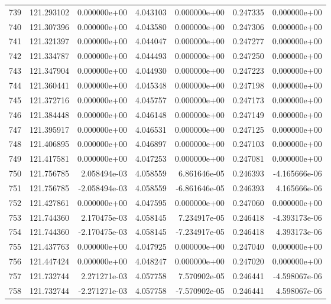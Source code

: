 \begin{tabular}{rrrrrrr}
 739 & 121.293102 &  0.000000e+00 &  4.043103 &  0.000000e+00 &   0.247335 &  0.000000e+00 \\
 740 & 121.307396 &  0.000000e+00 &  4.043580 &  0.000000e+00 &   0.247306 &  0.000000e+00 \\
 741 & 121.321397 &  0.000000e+00 &  4.044047 &  0.000000e+00 &   0.247277 &  0.000000e+00 \\
 742 & 121.334787 &  0.000000e+00 &  4.044493 &  0.000000e+00 &   0.247250 &  0.000000e+00 \\
 743 & 121.347904 &  0.000000e+00 &  4.044930 &  0.000000e+00 &   0.247223 &  0.000000e+00 \\
 744 & 121.360441 &  0.000000e+00 &  4.045348 &  0.000000e+00 &   0.247198 &  0.000000e+00 \\
 745 & 121.372716 &  0.000000e+00 &  4.045757 &  0.000000e+00 &   0.247173 &  0.000000e+00 \\
 746 & 121.384448 &  0.000000e+00 &  4.046148 &  0.000000e+00 &   0.247149 &  0.000000e+00 \\
 747 & 121.395917 &  0.000000e+00 &  4.046531 &  0.000000e+00 &   0.247125 &  0.000000e+00 \\
 748 & 121.406895 &  0.000000e+00 &  4.046897 &  0.000000e+00 &   0.247103 &  0.000000e+00 \\
 749 & 121.417581 &  0.000000e+00 &  4.047253 &  0.000000e+00 &   0.247081 &  0.000000e+00 \\
 750 & 121.756785 &  2.058494e-03 &  4.058559 &  6.861646e-05 &   0.246393 & -4.165666e-06 \\
 751 & 121.756785 & -2.058494e-03 &  4.058559 & -6.861646e-05 &   0.246393 &  4.165666e-06 \\
 752 & 121.427861 &  0.000000e+00 &  4.047595 &  0.000000e+00 &   0.247060 &  0.000000e+00 \\
 753 & 121.744360 &  2.170475e-03 &  4.058145 &  7.234917e-05 &   0.246418 & -4.393173e-06 \\
 754 & 121.744360 & -2.170475e-03 &  4.058145 & -7.234917e-05 &   0.246418 &  4.393173e-06 \\
 755 & 121.437763 &  0.000000e+00 &  4.047925 &  0.000000e+00 &   0.247040 &  0.000000e+00 \\
 756 & 121.447424 &  0.000000e+00 &  4.048247 &  0.000000e+00 &   0.247020 &  0.000000e+00 \\
 757 & 121.732744 &  2.271271e-03 &  4.057758 &  7.570902e-05 &   0.246441 & -4.598067e-06 \\
 758 & 121.732744 & -2.271271e-03 &  4.057758 & -7.570902e-05 &   0.246441 &  4.598067e-06 \\

\end{tabular}
